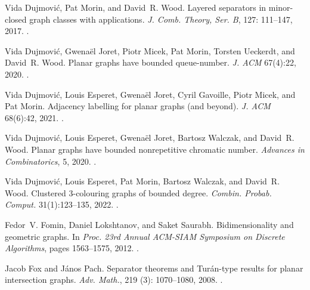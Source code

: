 \documentclass{patmorin}
\begin{document}
\begin{thebibliography}{37}
	Vida Dujmovi\'c, Pat Morin, and David~R. Wood.
	\newblock Layered separators in minor-closed graph classes with applications.
	\newblock \emph{J. Comb. Theory, Ser. {B}}, 127: 111--147,
	2017{}.
	\newblock {}.
	
	Vida Dujmovi{\'c}, Gwena\"{e}l Joret, Piotr Micek, Pat Morin, Torsten Ueckerdt,
	and David~R. Wood.
	\newblock Planar graphs have bounded queue-number.
	\newblock \emph{J. ACM} 67(4):22, 2020.
	\newblock {}.	
	
	Vida Dujmovi\'c, Louis Esperet, Gwena\"el Joret, Cyril Gavoille, Piotr Micek,
	and Pat Morin.
	\newblock Adjacency labelling for planar graphs (and beyond).
	\newblock \emph{J. ACM} 68(6):42, 2021. 
	\newblock {}. 
	
	Vida Dujmovi\'c, Louis Esperet, Gwena{\"{e}}l Joret, Bartosz Walczak, and
	David~R. Wood.
	\newblock Planar graphs have bounded nonrepetitive chromatic number.
	\newblock \emph{Advances in Combinatorics}, 5, 2020{}.
	\newblock {}.
	
	Vida Dujmovi{\'c}, Louis Esperet, Pat Morin, Bartosz Walczak, and
 David~R. Wood.
	\newblock Clustered 3-colouring graphs of bounded degree.
\newblock \emph{Combin. Probab. Comput.} 31(1):123--135, 2022.
\newblock {}. 
	
	Fedor~V. Fomin, Daniel Lokshtanov, and Saket Saurabh.
	\newblock Bidimensionality and geometric graphs.
	\newblock In \emph{Proc. 23rd {A}nnual {ACM}-{SIAM} {S}ymposium on {D}iscrete
		{A}lgorithms}, pages 1563--1575, 2012.
	\newblock {}.
	
	Jacob Fox and J{\'a}nos Pach.
	\newblock Separator theorems and {T}ur\'an-type results for planar intersection
	graphs.
	\newblock \emph{Adv. Math.}, 219 (3): 1070--1080, 2008.
	\newblock {}.
	

\end{thebibliography}
\end{document}
